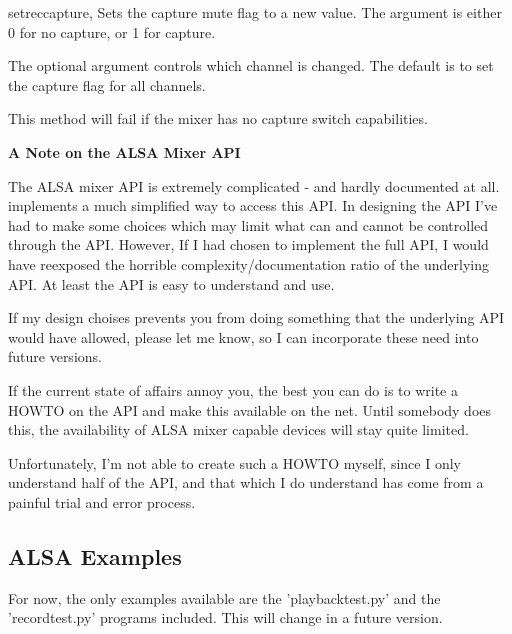 \begin{methoddesc}[Mixer]{setrec}{capture,}
  Sets the capture mute flag to a new value. The 
  argument is either 0 for no capture, or 1 for capture.

  The optional  argument controls which channel is
  changed. The default is to set the capture flag for all channels.

  This method will fail if the mixer has no capture switch
  capabilities.
\end{methoddesc}


\textbf{A Note on the ALSA Mixer API}

The ALSA mixer API is extremely complicated - and hardly documented at
all.  implements a much simplified way to access
this API. In designing the API I've had to make some choices which may
limit what can and cannot be controlled through the API. However, If I
had chosen to implement the full API, I would have reexposed the
horrible complexity/documentation ratio of the underlying API.  At
least the  API is easy to understand and use.

If my design choises prevents you from doing something that the
underlying API would have allowed, please let me know, so I can
incorporate these need into future versions.

If the current state of affairs annoy you, the best you can do is to
write a HOWTO on the API and make this available on the net. Until
somebody does this, the availability of ALSA mixer capable devices
will stay quite limited.

Unfortunately, I'm not able to create such a HOWTO myself, since I
only understand half of the API, and that which I do understand has
come from a painful trial and error process.



\subsection{ALSA Examples \label{pcm-example}}

For now, the only examples available are the 'playbacktest.py' and the
'recordtest.py' programs included.  This will change in a future
version.

